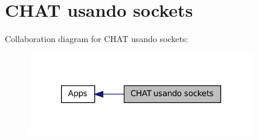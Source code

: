 \hypertarget{group__CHAT}{
\section{CHAT usando sockets}
\label{group__CHAT}
}


Collaboration diagram for CHAT usando sockets:
\nopagebreak
\begin{figure}[H]
\begin{center}
\leavevmode
\includegraphics[width=278pt]{group__CHAT}
\end{center}
\end{figure}


